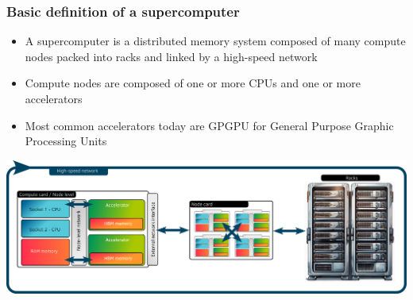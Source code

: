 \documentclass[aspectratio=169]{beamer}
\begin{document}

\begin{frame}
    \frametitle{Basic definition of a supercomputer}

    \begin{itemize}
        \item A supercomputer is a distributed memory system composed of many compute nodes packed into racks and linked by a high-speed network
        \item Compute nodes are composed of one or more CPUs and one or more accelerators
        \item Most common accelerators today are GPGPU for General Purpose Graphic Processing Units
    \end{itemize}

    \begin{center}
        \includegraphics[width=\textwidth]{../../images/super-computer_architecture.png}
    \end{center}

\end{frame}

\end{document}
